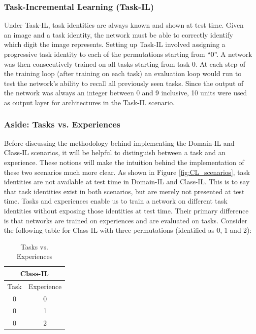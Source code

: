 \documentclass{article}
\begin{document}
\subsubsection{Task-Incremental Learning (Task-IL)}
Under Task-IL, task identities are always known and shown at test time. Given an image and a task identity, the network must be able to correctly identify which digit the image represents. Setting up Task-IL involved assigning a progressive task identity to each of the permutations starting from “0”. A network was then consecutively trained on all tasks starting from task 0. At each step of the training loop (after training on each task) an evaluation loop would run to test the network’s ability to recall all previously seen tasks. Since the output of the network was always an integer between 0 and 9 inclusive, 10 units were used as output layer for architectures in the Task-IL scenario.

\subsubsection{Aside: Tasks vs. Experiences}
Before discussing the methodology behind implementing the Domain-IL and Class-IL scenarios, it will be helpful to distinguish between a task and an experience. These notions will make the intuition behind the implementation of these two scenarios much more clear. As shown in Figure \ref{fig:CL_scenarios}, task identities are not available at test time in Domain-IL and Class-IL. This is to say that task identities exist in both scenarios, but are merely not presented at test time. Tasks and experiences enable us to train a network on different task identities without exposing those identities at test time. Their primary difference is that networks are trained on experiences and are evaluated on tasks. Consider the following table for Class-IL with three permutations (identified as 0, 1 and 2): 

\begin{table}[h]
\centering
\caption{Tasks vs. Experiences}
\begin{tabular}{|c|c|}
\hline
\multicolumn{2}{|c|}{Class-IL} \\ \hline
Task        & Experience       \\ \hline
0           & 0                \\ \hline
0           & 1                \\ \hline
0           & 2                \\ \hline
\end{tabular}
\label{Tab:tasks_vs_experiences}
\end{table}
\end{document}
